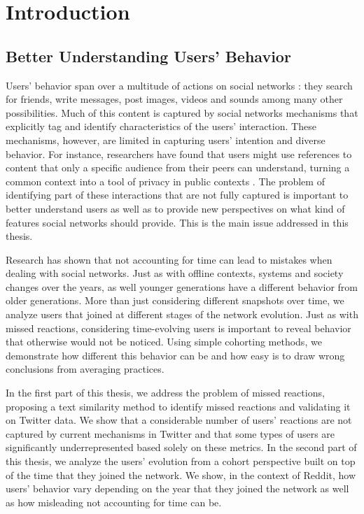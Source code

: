 \chapter{Introduction}


\section{Better Understanding Users' Behavior}

Users' behavior span over a multitude of actions on social networks \cite{Benevenuto2009, Gilbert2009, Comarela2012}: they search for friends, write messages, post images, videos and sounds among many other possibilities. Much of this content is captured by social networks mechanisms that explicitly tag and identify characteristics of the users' interaction. These mechanisms, however, are limited in capturing users' intention and diverse behavior. For instance, researchers have found that users might use references to content that only a specific audience from their peers can understand, turning a common context into a tool of privacy in public contexts \cite{Boyd2011}. The problem of identifying part of these interactions that are not fully captured is important to better understand users as well as to provide new perspectives on what kind of features social networks should provide. This is the main issue addressed in this thesis.

Research has shown that not accounting for time can lead to mistakes when dealing with social networks. Just as with offline contexts, systems and society changes over the years, as well younger generations have a different behavior from older generations. More than just considering different snapshots over time, we analyze users that joined at different stages of the network evolution. Just as with missed reactions, considering time-evolving users is important to reveal behavior that otherwise would not be noticed. Using simple cohorting methods, we demonstrate how different this behavior can be and how easy is to draw wrong conclusions from averaging practices.

In the first part of this thesis, we address the problem of missed reactions, proposing a text similarity method to identify missed reactions and validating it on Twitter data. We show that a considerable number of users' reactions are not captured by current mechanisms in Twitter and that some types of users are significantly underrepresented based solely on these metrics. In the second part of this thesis, we analyze the users' evolution from a cohort perspective built on top of the time that they joined the network. We show, in the context of Reddit, how users' behavior vary depending on the year that they joined the network as well as how misleading not accounting for time can be. 

